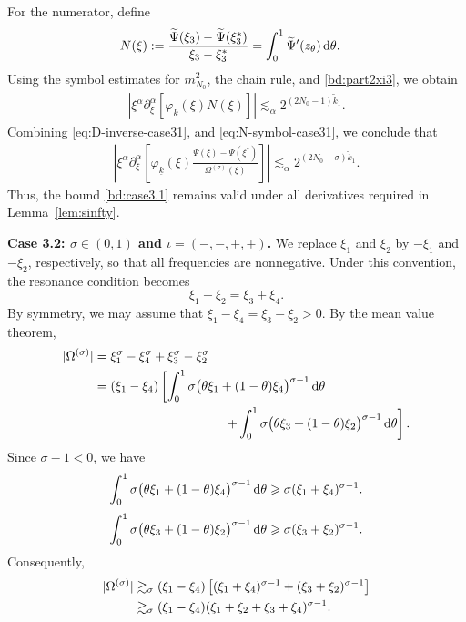 \documentclass[UTF-8,reqno]{amsart}
\numberwithin{equation}{section}
\theoremstyle{definition}
\def\dif{{\mathord{{\rm d}}}}
\def\geq{\geqslant}
\def\dif{{\mathord{{\rm d}}}}
\def\geq{\geqslant}
\begin{document}
For the numerator, define
\begin{align*}
N(\xi)
&:=
\frac{
\widetilde\Psi(\xi_3)
-\widetilde\Psi(\xi_3^*)
}{
\xi_3-\xi_3^*
} =
\int_0^1
\widetilde\Psi'(z_\theta)
\,\dif\theta.
\end{align*}
Using the symbol estimates for $m_{N_0}^2$, the chain rule, and
\eqref{bd:part2xi3}, we obtain
\begin{align}
\left|
\xi^\alpha\partial_\xi^\alpha
\left[
\varphi_{\underline k}(\xi)N(\xi)
\right]
\right|
\lesssim_\alpha
2^{(2N_0-1)\widetilde k_1}.
\label{eq:N-symbol-case31}
\end{align}
Combining  
\eqref{eq:D-inverse-case31}, and
\eqref{eq:N-symbol-case31}, we conclude that
\begin{align}
\left|
\xi^\alpha\partial_\xi^\alpha
\left[
\varphi_{\underline{k}}(\xi)
\frac{\Psi(\xi)-\Psi(\xi^*)}
     {\Omega^{(\sigma)}(\xi)}
\right]
\right|
\lesssim_\alpha
2^{(2N_0-\sigma)\widetilde{k}_1}.
\label{eq:case31-all-derivatives}
\end{align}
Thus, the bound \eqref{bd:case3.1} remains valid under all derivatives
required in Lemma~\ref{lem:sinfty}.

\medskip

\textbf{Case 3.2: $\sigma\in(0,1)$ and
$\iota=(-,-,+,+)$.}
We replace $\xi_1$ and $\xi_2$ by $-\xi_1$ and $-\xi_2$,
respectively, so that all frequencies are nonnegative. Under this
convention, the resonance condition becomes
\[
    \xi_1+\xi_2=\xi_3+\xi_4.
\]
By symmetry, we may assume that $\xi_1-\xi_4=\xi_3-\xi_2>0.$ 
By the mean value theorem,
\begin{align}
|\Omega^{(\sigma)}|
&=
\xi_1^\sigma-\xi_4^\sigma
+\xi_3^\sigma-\xi_2^\sigma
\notag\\
&=
(\xi_1-\xi_4)
\left[
\int_0^1
\sigma
\bigl(
    \theta\xi_1+(1-\theta)\xi_4
\bigr)^{\sigma-1}
\,\dif\theta
\right.
\notag\\
&\hspace{3.6cm}\left.
+
\int_0^1
\sigma
\bigl(
    \theta\xi_3+(1-\theta)\xi_2
\bigr)^{\sigma-1}
\,\dif\theta
\right].
\label{eq:omega-case32-mvt}
\end{align}
Since $\sigma-1<0$,
we have
\begin{align*}
\int_0^1
\sigma
\bigl(
    \theta\xi_1+(1-\theta)\xi_4
\bigr)^{\sigma-1}
\,\dif\theta
\geq
\sigma(\xi_1+\xi_4)^{\sigma-1}.
\end{align*} 
\begin{align*}
\int_0^1
\sigma
\bigl(
    \theta\xi_3+(1-\theta)\xi_2
\bigr)^{\sigma-1}
\,\dif\theta
\geq
\sigma(\xi_3+\xi_2)^{\sigma-1}.
\end{align*}
Consequently,
\begin{align}
|\Omega^{(\sigma)}|
&\gtrsim_\sigma
(\xi_1-\xi_4)\left[
    (\xi_1+\xi_4)^{\sigma-1}
    +(\xi_3+\xi_2)^{\sigma-1}
\right]
\notag\\
&\gtrsim_\sigma
(\xi_1-\xi_4)
(\xi_1+\xi_2+\xi_3+\xi_4)^{\sigma-1}.\notag
\end{align}
\end{document}
